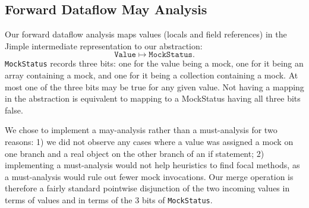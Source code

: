 \subsection{Forward Dataflow May Analysis}

Our forward dataflow analysis maps values (locals and field references) in the Jimple intermediate representation to our abstraction:
\[ \mathtt{Value} \mapsto \mathtt{MockStatus}. \]
\texttt{MockStatus} records three bits: one for the value being a mock, one for it being an array containing a mock, and one for it being a collection containing a mock. At most one of the three bits may be true for any given value. Not having a mapping in the abstraction is equivalent to mapping to a MockStatus having all three bits false. 

We chose to implement a may-analysis rather than a must-analysis for two reasons: 1) we did not observe any cases where a value was assigned a mock on one branch and a real object on the other branch of an if statement; 2) implementing a must-analysis would not help heuristics to find focal methods, as a must-analysis would rule out fewer mock invocations. Our merge operation is therefore a fairly standard pointwise disjunction of the two incoming values in terms of values and in terms of the 3 bits of \texttt{MockStatus}.



